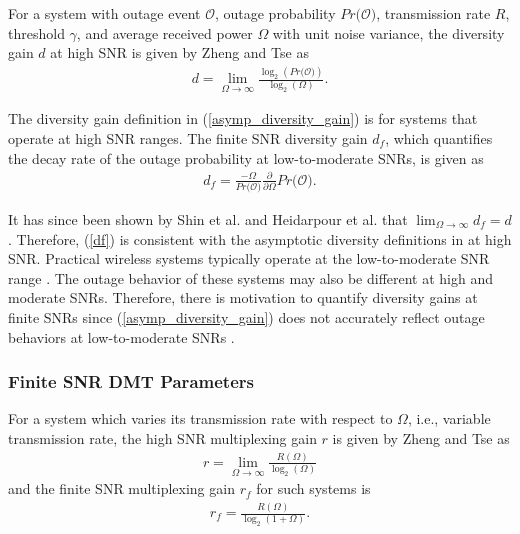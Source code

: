 For a system with outage event $\mathcal{O}$, outage probability $Pr\big(\mathcal{O}\big)$, transmission rate $R$, threshold $\gamma$, and average received power $\Omega$ with unit noise variance, the diversity gain $d$ at high SNR is given by Zheng and Tse \cite{zheng2003diversity} as
\begin{eqnarray} \label{asymp_diversity_gain}
 d = \lim_{\Omega\to\infty} \frac{\log_2(Pr\big(\mathcal{O}\big))}{\log_2(\Omega)}.
\end{eqnarray}

The diversity gain definition in (\ref{asymp_diversity_gain}) is for systems that operate at high SNR ranges. The finite SNR diversity gain $d_f$, which quantifies the decay rate of the outage probability at low-to-moderate SNRs, is given as \cite[eq. (5)]{narasimhan2006finite}
\begin{eqnarray} \label{df}
d_f = \frac{-\Omega}{Pr\big(\mathcal{O}\big)}\frac{\partial}{\partial\Omega}Pr\big(\mathcal{O}\big).
\end{eqnarray}

It has since been shown by Shin et al. \cite{shin2008diversity} and Heidarpour et al. \cite{heidarpour2017finite} that $\lim_{\Omega\to\infty}d_f = d$. Therefore, (\ref{df}) is consistent with the asymptotic diversity definitions in \cite{zheng2003diversity} at high SNR. Practical wireless systems typically operate at the low-to-moderate SNR range \cite{narasimhan2006finite}. The outage behavior of these systems may also be different at high and moderate SNRs. Therefore, there is motivation to quantify diversity gains at finite SNRs since (\ref{asymp_diversity_gain}) does not accurately reflect outage behaviors at low-to-moderate SNRs \cite{shin2008diversity}. 

\subsubsection{Finite SNR DMT Parameters}
For a system which varies its transmission rate with respect to $\Omega$, i.e., variable transmission rate, the high SNR multiplexing gain $r$ is given by Zheng and Tse \cite{zheng2003diversity} as
\begin{eqnarray} \label{asymp_mult_gain}
r = \lim_{\Omega\to\infty} \frac{R(\Omega)}{\log_2(\Omega)}
\end{eqnarray}
and the finite SNR multiplexing gain $r_f$ for such systems is \cite[eq. (4)]{narasimhan2006finite}
\begin{eqnarray} \label{rf}
r_f = \frac{R(\Omega)}{\log_2(1+\Omega)}.
\end{eqnarray}

